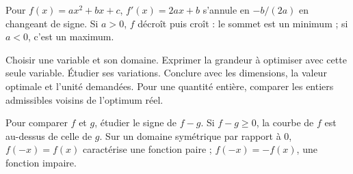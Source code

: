 \begin{exemple}
Pour $f(x)=ax^2+bx+c$, $f'(x)=2ax+b$ s'annule en $-b/(2a)$ en changeant de signe.
Si $a>0$, $f$ décroît puis croît : le sommet est un minimum ; si $a<0$, c'est un maximum.
\end{exemple}
\begin{savoirfaire}
Choisir une variable et son domaine. Exprimer la grandeur à optimiser avec
cette seule variable. Étudier ses variations. Conclure avec les dimensions,
la valeur optimale et l'unité demandées. Pour une quantité entière, comparer
les entiers admissibles voisins de l'optimum réel.
\end{savoirfaire}
\begin{propriete}
Pour comparer $f$ et $g$, étudier le signe de $f-g$. Si $f-g\geq0$, la courbe
de $f$ est au-dessus de celle de $g$.
Sur un domaine symétrique par rapport à 0, $f(-x)=f(x)$ caractérise une fonction
paire ; $f(-x)=-f(x)$, une fonction impaire.
\end{propriete}
\begin{center}
\hspace{3mm}
\par
{}
\end{center}
\exercices

